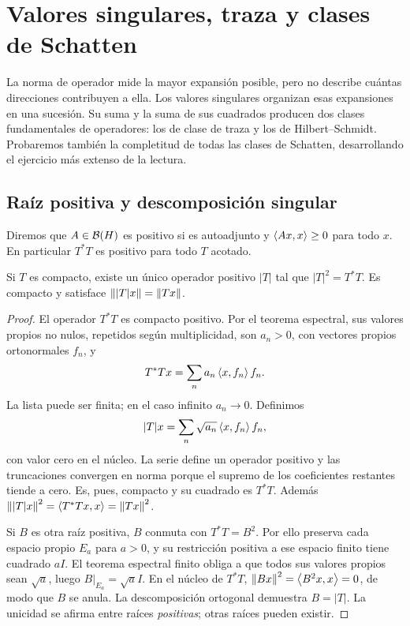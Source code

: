 \chapter{Valores singulares, traza y clases de Schatten}\label{cap:v3-07}
La norma de operador mide la mayor expansión posible, pero no describe cuántas direcciones contribuyen a ella. Los valores singulares organizan esas expansiones en una sucesión. Su suma y la suma de sus cuadrados producen dos clases fundamentales de operadores: los de clase de traza y los de Hilbert--Schmidt. Probaremos también la completitud de todas las clases de Schatten, desarrollando el ejercicio más extenso de la lectura.

\section{Raíz positiva y descomposición singular}\label{lec:v3-12}
Diremos que $A\in\mathcal B(H)$ es positivo si es autoadjunto y $\left\langle Ax,x\right\rangle\ge0$ para todo $x$. En particular $T^*T$ es positivo para todo $T$ acotado.

\begin{proposicion}\label{v3:raiz-compacta}
Si $T$ es compacto, existe un único operador positivo $|T|$ tal que $|T|^2=T^*T$. Es compacto y satisface $\left\lVert|T|x\right\rVert=\left\lVert Tx\right\rVert$.
\end{proposicion}
\begin{proof}
El operador $T^*T$ es compacto positivo. Por el teorema espectral, sus valores propios no nulos, repetidos según multiplicidad, son $a_n>0$, con vectores propios ortonormales $f_n$, y
\[T^*Tx=\sum_n a_n\left\langle x,f_n\right\rangle f_n.
\]
La lista puede ser finita; en el caso infinito $a_n\to0$. Definimos
\[|T|x=\sum_n\sqrt{a_n}\left\langle x,f_n\right\rangle f_n,
\]
con valor cero en el núcleo. La serie define un operador positivo y las truncaciones convergen en norma porque el supremo de los coeficientes restantes tiende a cero. Es, pues, compacto y su cuadrado es $T^*T$. Además $\left\lVert|T|x\right\rVert^2=\left\langle T^*Tx,x\right\rangle=\left\lVert Tx\right\rVert^2$.

Si $B$ es otra raíz positiva, $B$ conmuta con $T^*T=B^2$. Por ello preserva cada espacio propio $E_a$ para $a>0$, y su restricción positiva a ese espacio finito tiene cuadrado $aI$. El teorema espectral finito obliga a que todos sus valores propios sean $\sqrt a$, luego $B|_{E_a}=\sqrt a I$. En el núcleo de $T^*T$, $\left\lVert Bx\right\rVert^2=\left\langle B^2x,x\right\rangle=0$, de modo que $B$ se anula. La descomposición ortogonal demuestra $B=|T|$. La unicidad se afirma entre raíces \emph{positivas}; otras raíces pueden existir.
\end{proof}

